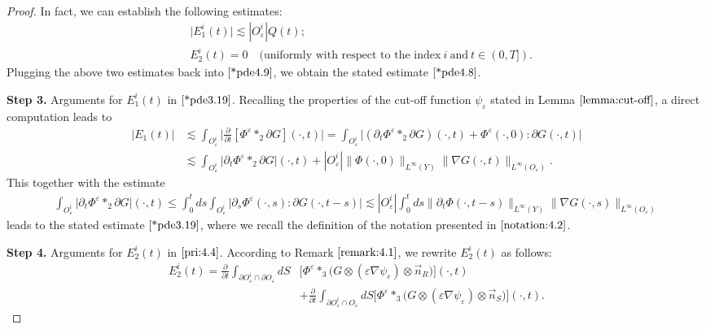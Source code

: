 \documentclass[13pt,CJK]{article}
\theoremstyle{plain}                       %
\theoremstyle{remark}
\numberwithin{equation}{section}
\begin{document}
\begin{proof}
In fact, we can establish the following estimates:
\begin{subequations}
\begin{align}
&\big|E_1^i(t)\big|\lesssim |O_{\varepsilon}^i|
  Q(t); \label{*pde3.19} \\
& E_2^i(t) = 0 \quad (\text{uniformly~with~respect~to~the index}~i~\text{and}~ t\in(0,T]).
\label{pri:4.4}
\end{align}
\end{subequations}
Plugging the above two estimates back into
$\eqref{*pde4.9}$, we obtain the stated estimate
$\eqref{*pde4.8}$.


\textbf{Step 3.} Arguments for $E_1^i(t)$ in $\eqref{*pde3.19}$.
Recalling the properties of the cut-off
function $\psi_{\varepsilon}$ stated in Lemma $\ref{lemma:cut-off}$, a direct computation
leads to
\begin{equation*}
\begin{aligned}
 |E_{1}(t)|
 &\lesssim\int_{O_{\varepsilon}^i}\bigg|\frac
 {\partial}{\partial t}[\Phi^\varepsilon\ast_2\partial G](\cdot,t)\bigg|
 =\int_{O_{\varepsilon}^i}
 \bigg|(\partial_t\Phi^\varepsilon
 \ast_2\partial G)(\cdot,t)+\Phi^\varepsilon(\cdot,0):\partial G(\cdot,t)\bigg|\\
 &\lesssim \int_{O_{\varepsilon}^i}
 \big|\partial_t\Phi^\varepsilon\ast_2\partial G\big|(\cdot,t)
+ |O_{\varepsilon}^i|
  \|\Phi(\cdot,0)\|_{L^{\infty}(Y)}\|\nabla G(\cdot,t)\|_{L^{\infty}(O_\varepsilon)}.
 \end{aligned}
\end{equation*}
This together with the estimate
\begin{equation*}
\begin{aligned}
\int_{O_{\varepsilon}^i}
 \big|\partial_t\Phi^\varepsilon\ast_2\partial G\big|(\cdot,t)
\leq
\int_{0}^tds\int_{O_{\varepsilon}^i}
\big|\partial_s\Phi^\varepsilon(\cdot,s):\partial G(\cdot,t-s)\big|
\lesssim 
|O_{\varepsilon}^i|
\int_{0}^{t}ds\|\partial_t
\Phi(\cdot,t-s)\|_{L^{\infty}(Y)}\|\nabla G(\cdot,s)\|_{L^{\infty}
(O_\varepsilon)}
\end{aligned}
\end{equation*}
leads to the stated estimate $\eqref{*pde3.19}$,
where we recall the definition of the notation
presented in  $\eqref{notation:4.2}$.


\textbf{Step 4.} Arguments for $E_2^i(t)$ in $\eqref{pri:4.4}$.
According to Remark $\ref{remark:4.1}$,
we rewrite $E_{2}^i(t)$ as follows:
\begin{equation}\label{}
\begin{aligned}
E_{2}^i(t)
  =\frac{\partial}{\partial t}
  \int_{\partial O_{\varepsilon}^i\cap \partial O_\varepsilon}dS
  &\big[\Phi^\varepsilon\ast_3 \big(G
  \otimes(\varepsilon\nabla\psi_{\varepsilon})\otimes
  \vec{n}_R\big)\big](\cdot,t) \\
&+ \frac{\partial}{\partial t}
  \int_{\partial O_{\varepsilon}^i\cap O_\varepsilon}dS
  \big[\Phi^\varepsilon\ast_3
  \big(G\otimes(\varepsilon\nabla\psi_{\varepsilon})\otimes
  \vec{n}_S\big)\big](\cdot,t).
\end{aligned}
\end{equation}


\end{proof}
\end{document}
